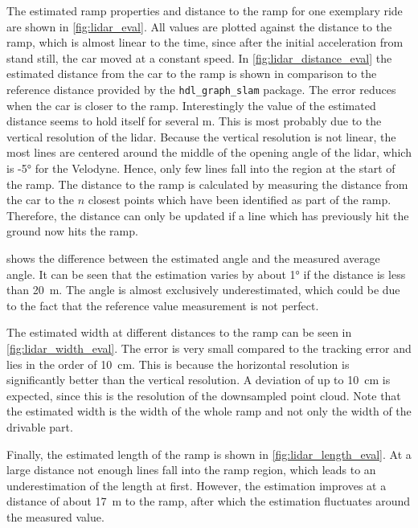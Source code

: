 \renewcommand{\arraystretch}{1.2}
The estimated ramp properties and distance to the ramp for one exemplary ride are shown in \cref{fig:lidar_eval}.
All values are plotted against the distance to the ramp, which is almost linear to the time, since after the initial acceleration from stand still, the car moved at a constant speed.
In \cref{fig:lidar_distance_eval} the estimated distance from the car to the ramp is shown in comparison to the reference distance provided by the \texttt{hdl\_graph\_slam} package.
The error reduces when the car is closer to the ramp.
Interestingly the value of the estimated distance seems to hold itself for several \si{\metre}.
This is most probably due to the vertical resolution of the \gls{lidar}.
Because the vertical resolution is not linear, the most lines are centered around the middle of the opening angle of the \gls{lidar}, which is -\ang{5} for the Velodyne.
Hence, only few lines fall into the region at the start of the ramp.
The distance to the ramp is calculated by measuring the distance from the car to the $n$ closest points which have been identified as part of the ramp.
Therefore, the distance can only be updated if a line which has previously hit the ground now hits the ramp.\par
{} shows the difference between the estimated angle and the measured average angle.
It can be seen that the estimation varies by about \ang{1} if the distance is less than \SI{20}{\metre}.
The angle is almost exclusively underestimated, which could be due to the fact that the reference value measurement is not perfect.\par
The estimated width at different distances to the ramp can be seen in \cref{fig:lidar_width_eval}.
The error is very small compared to the tracking error and lies in the order of \SI{10}{\cm}.
This is because the horizontal resolution is significantly better than the vertical resolution.
A deviation of up to \SI{10}{\cm} is expected, since this is the resolution of the downsampled point cloud.
Note that the estimated width is the width of the whole ramp and not only the width of the drivable part.\par
Finally, the estimated length of the ramp is shown in \cref{fig:lidar_length_eval}.
At a large distance not enough lines fall into the ramp region, which leads to an underestimation of the length at first.
However, the estimation improves at a distance of about \SI{17}{\metre} to the ramp, after which the estimation fluctuates around the measured value.\par
